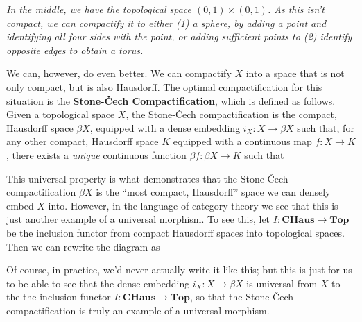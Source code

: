 \begin{example}
\begin{center}
            \emph{In the middle, we have the topological space 
            $(0,1)\times (0,1)$. As this isn't compact, we can compactify it 
            to either (1) a sphere, 
            by adding a point and identifying all four sides with the point, 
            or adding sufficient points to (2) identify opposite edges 
            to obtain a torus.}
        \end{center}
        
        We can, however, do even better. We can compactify $X$ into a space that is 
        not only compact, but is also Hausdorff. The optimal compactification 
        for this situation is the \textbf{Stone-Čech Compactification}, which 
        is defined as follows.
        Given a topological space $X$, the Stone-Čech compactification is the compact, Hausdorff 
        space $\beta X$, equipped with a dense embedding 
        $i_X: X \to \beta X$ such that, for any other compact, Hausdorff space $K$ equipped 
        with a continuous map $f: X \to K$, there exists a \emph{unique} continuous function 
        $\beta f: \beta X \to K$ such that 
        \begin{center}
        \end{center}
        This universal property is what demonstrates that the Stone-Čech compactification 
        $\beta X$ is the ``most compact, Hausdorff'' space we can densely embed $X$ into. 
        However, in the language of category theory we see that this is just another example of 
        a universal morphism. To see this, let $I: \textbf{CHaus} \to \textbf{Top}$ 
        be the inclusion functor from compact Hausdorff spaces into topological spaces. 
        Then we can rewrite the diagram as 
        \begin{center}
        \end{center}
        Of course, in practice, we'd never actually write it like this; but this is just for 
        us to be able to see that the dense embedding $i_X: X \to \beta X$ is universal 
        from $X$ to the the inclusion functor $I:  \textbf{CHaus} \to \textbf{Top}$, so that the 
        Stone-Čech compactification is truly an example of a universal morphism.
    \end{example} 

